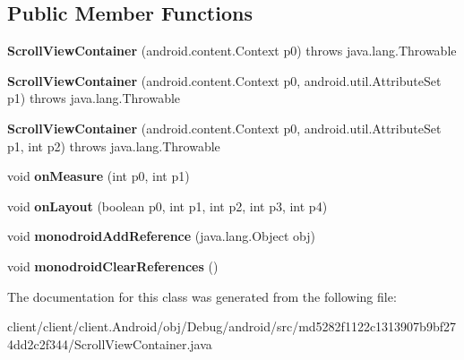 \subsection*{Public Member Functions}
\begin{DoxyCompactItemize}
\item 
\hypertarget{classmd5282f1122c1313907b9bf274dd2c2f344_1_1ScrollViewContainer_af0178d3306aba5a5bf0b4366b6a3e73c}{}{\bfseries Scroll\+View\+Container} (android.\+content.\+Context p0)  throws java.\+lang.\+Throwable 	\label{classmd5282f1122c1313907b9bf274dd2c2f344_1_1ScrollViewContainer_af0178d3306aba5a5bf0b4366b6a3e73c}

\item 
\hypertarget{classmd5282f1122c1313907b9bf274dd2c2f344_1_1ScrollViewContainer_adda146b8f61e6f26b475fa898d13879d}{}{\bfseries Scroll\+View\+Container} (android.\+content.\+Context p0, android.\+util.\+Attribute\+Set p1)  throws java.\+lang.\+Throwable 	\label{classmd5282f1122c1313907b9bf274dd2c2f344_1_1ScrollViewContainer_adda146b8f61e6f26b475fa898d13879d}

\item 
\hypertarget{classmd5282f1122c1313907b9bf274dd2c2f344_1_1ScrollViewContainer_acd809c909d80113c8a80437e928a6094}{}{\bfseries Scroll\+View\+Container} (android.\+content.\+Context p0, android.\+util.\+Attribute\+Set p1, int p2)  throws java.\+lang.\+Throwable 	\label{classmd5282f1122c1313907b9bf274dd2c2f344_1_1ScrollViewContainer_acd809c909d80113c8a80437e928a6094}

\item 
\hypertarget{classmd5282f1122c1313907b9bf274dd2c2f344_1_1ScrollViewContainer_a7ae824a31f869e41d0a2be7372400b3b}{}void {\bfseries on\+Measure} (int p0, int p1)\label{classmd5282f1122c1313907b9bf274dd2c2f344_1_1ScrollViewContainer_a7ae824a31f869e41d0a2be7372400b3b}

\item 
\hypertarget{classmd5282f1122c1313907b9bf274dd2c2f344_1_1ScrollViewContainer_aa4b580c78543bd1fcc70fc704c190c63}{}void {\bfseries on\+Layout} (boolean p0, int p1, int p2, int p3, int p4)\label{classmd5282f1122c1313907b9bf274dd2c2f344_1_1ScrollViewContainer_aa4b580c78543bd1fcc70fc704c190c63}

\item 
\hypertarget{classmd5282f1122c1313907b9bf274dd2c2f344_1_1ScrollViewContainer_a8b4f0cebb5e870a9da3c4f8e9b24e9e9}{}void {\bfseries monodroid\+Add\+Reference} (java.\+lang.\+Object obj)\label{classmd5282f1122c1313907b9bf274dd2c2f344_1_1ScrollViewContainer_a8b4f0cebb5e870a9da3c4f8e9b24e9e9}

\item 
\hypertarget{classmd5282f1122c1313907b9bf274dd2c2f344_1_1ScrollViewContainer_a000fc8d58dc5b90999b8fc2c24b4a7ee}{}void {\bfseries monodroid\+Clear\+References} ()\label{classmd5282f1122c1313907b9bf274dd2c2f344_1_1ScrollViewContainer_a000fc8d58dc5b90999b8fc2c24b4a7ee}

\end{DoxyCompactItemize}


The documentation for this class was generated from the following file\+:\begin{DoxyCompactItemize}
\item 
client/client/client.\+Android/obj/\+Debug/android/src/md5282f1122c1313907b9bf274dd2c2f344/Scroll\+View\+Container.\+java\end{DoxyCompactItemize}
